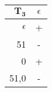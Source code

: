 \begingroup
\scriptsize
\begin{tabular}{r | c}
    $\mathbf{T_3}$ & $\epsilon$ \\ \hline
    $\epsilon$ & + \\
    51 & - \\ \hline
    0 & + \\
    51,0 & -
\end{tabular}
\endgroup
